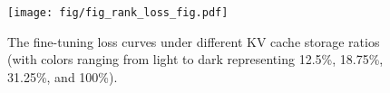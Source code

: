\begin{figure}[t]
  \centering
  \texttt{[image: fig/fig\_rank\_loss\_fig.pdf]}
  \caption{The fine-tuning loss curves under different KV cache storage ratios (with colors ranging from light to dark representing 12.5\%, 18.75\%, 31.25\%, and 100\%).}
  \label{fig:rank_loss}
  \vspace{-0.3cm}
\end{figure}